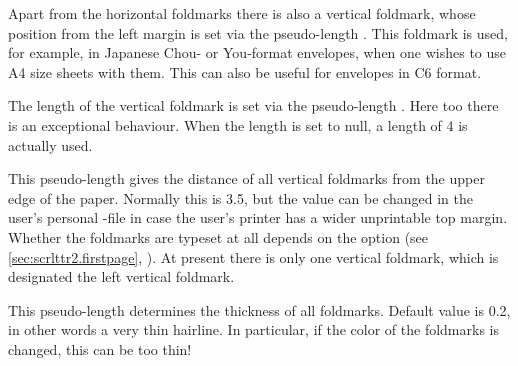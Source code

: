 \begin{Declaration}
\end{Declaration}
%
Apart from the horizontal foldmarks there
is also a vertical foldmark, whose position from the left margin is set via
the pseudo-length . This foldmark is used, for example,
in Japanese Chou- or You-format envelopes, when one wishes to use A4 size
sheets with them. This can also be useful for envelopes in C6 format.%
%


\begin{Declaration}
\end{Declaration}
%
The length of the vertical foldmark is set
via the pseudo-length .  Here too there is an
exceptional behaviour. When the length is set to null, a length of 4
is actually used.%
%


\begin{Declaration}
\end{Declaration}
%
This pseudo-length gives the distance of
all vertical foldmarks from the upper edge of the paper. Normally this is
3.5, but the value can be changed in the user's
personal -file in case the user's printer has a wider unprintable
top margin.  Whether the foldmarks are typeset at all depends on the option
%
 (see
\autoref{sec:scrlttr2.firstpage},
). At present there is only one
vertical foldmark, which is designated the left vertical foldmark.
%
%


\begin{Declaration}
\end{Declaration}
%
This pseudo-length determines the
thickness of all foldmarks. Default value is 0.2, in other words a
very thin hairline. In particular, if the color of the foldmarks is
changed, this can be too thin!%
%
%


